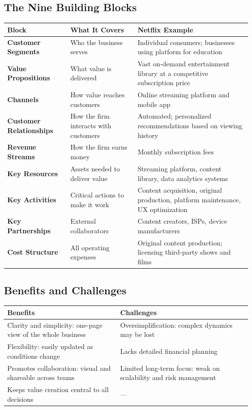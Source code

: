 \documentclass[11pt, letterpaper]{article}
\begin{document}
\subsection{The Nine Building Blocks}

\begin{center}
\begin{tabular}{>{\bfseries}p{3.5cm} p{4cm} p{5.5cm}}
\toprule
Block & What It Covers & Netflix Example \\
\midrule
Customer Segments & Who the business serves & Individual consumers; businesses using platform for education \\
\addlinespace
Value Propositions & What value is delivered & Vast on-demand entertainment library at a competitive subscription price \\
\addlinespace
Channels & How value reaches customers & Online streaming platform and mobile app \\
\addlinespace
Customer Relationships & How the firm interacts with customers & Automated; personalized recommendations based on viewing history \\
\addlinespace
Revenue Streams & How the firm earns money & Monthly subscription fees \\
\addlinespace
Key Resources & Assets needed to deliver value & Streaming platform, content library, data analytics systems \\
\addlinespace
Key Activities & Critical actions to make it work & Content acquisition, original production, platform maintenance, UX optimization \\
\addlinespace
Key Partnerships & External collaborators & Content creators, ISPs, device manufacturers \\
\addlinespace
Cost Structure & All operating expenses & Original content production; licensing third-party shows and films \\
\bottomrule
\end{tabular}
\end{center}

\subsection{Benefits and Challenges}

\begin{center}
\begin{tabular}{p{6.5cm} p{6.5cm}}
\toprule
\textbf{Benefits} & \textbf{Challenges} \\
\midrule
Clarity and simplicity: one-page view of the whole business & Oversimplification: complex dynamics may be lost \\
Flexibility: easily updated as conditions change & Lacks detailed financial planning \\
Promotes collaboration: visual and shareable across teams & Limited long-term focus: weak on scalability and risk management \\
Keeps value creation central to all decisions & --- \\
\bottomrule
\end{tabular}
\end{center}
\end{document}
